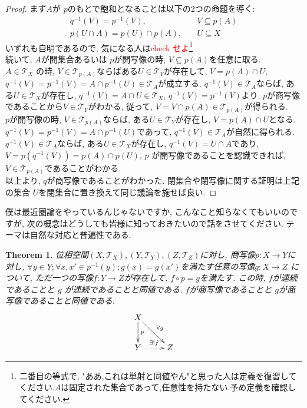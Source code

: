 \documentclass[dvipdfmx]{jbook}
\newtheorem{theorem}{Theorem}[section]
\theoremstyle{remark}
\theoremstyle{plain}
\begin{document}
\begin{proof}%
	まず$A$が $p$のもとで飽和となることは以下の2つの命題を導く:
	 \[
	\begin{aligned}%
		q^{-1}(V) = p ^{-1}(V), \quad & V \subseteq p(A)\\
		p(U\cap A) = p(U) \cap p(A), \quad & U\subseteq X 
	\end{aligned}
	\]
	いずれも自明であるので, 気になる人は\textcolor{red}{check せよ}\footnote{二番目の等式で, "ああ,これは単射と同値やん"と思った人は定義を復習してください.$A$は固定された集合であって,任意性を持たない.予め定義を確認してください.}\\
	続いて, $A$が開集合あるいは $p$が開写像の時,  $V \subseteq p(A)$を任意に取る.\\
	$A \in \mathcal{T}_X$ の時, $V \in \mathcal{T}_{p(A)}$ならばある$U \in \mathcal{T}_Y $が存在して, 
	$V = p(A) \cap U$, $q^{-1}(V) = p ^{-1}(V) = A \cap p^{-1}(U) \in \mathcal{T}_A$が成立する. 
	$q^{-1}(V) \in \mathcal{T}_A$ならば, ある$U \in \mathcal{T}_X$が存在し, 
	$q^{-1}(V) = A \cap U \in \mathcal{T}_X$, $q^{-1}(V) = p ^{-1}(V)$より, 
	$p$が商写像であることから$V \in \mathcal{T}_Y$がわかる, 従って, $V =V \cap p(A)\in \mathcal{T}_{p(A)}$が得られる. \\
	$p$が開写像の時,  $V \in \mathcal{T}_{p(A)}$ならば, ある$U \in \mathcal{T}_Y$が存在し, 
	$V = p(A) \cap U$となる. 
	$q^{-1}(V) = p ^{-1}(V) = A \cap p ^{-1}(U)$であって, 
	$q^{-1}(V) \in \mathcal{T}_A$が自然に得られる. 
	$q^{-1}(V) \in \mathcal{T}_A$ならば, ある$U \in \mathcal{T}_X$が存在し,
	$q^{-1} (V) =U \cap A$であり, $V=p(q^{-1}(V)) = p(A) \cap p(U)$, 
	$p$ が開写像であることを認識できれば, $V \in \mathcal{T}_{p(A)}$であることがわかる.\\
	以上より, $q$が商写像であることがわかった. 閉集合や閉写像に関する証明は上記の集合 $U$を閉集合に置き換えて同じ議論を施せば良い.
\end{proof}

僕は最近圏論をやっているんじゃないですか, こんなこと知らなくてもいいのですが, 次の概念はどうしても皆様に知っておきたいので話をさせてください. テーマは自然な対応と普遍性である.

\begin{theorem}%
	位相空間$\left( X, \mathcal{T}_X \right) ,\left( Y,\mathcal{T}_Y \right) , \left( Z , \mathcal{T}_Z\right) $に対し, 商写像$p: X \to Y$に対し, $\forall y \in Y; \forall x ,x'\in p ^{-1}({y});g(x)=g(x')$を満たす任意の写像$g: X \to Z$ について, ただ一つの写像$f: Y\to Z$が存在して, $f \circ p = g$を満たす. この時,  $f$が連続であることと $g$ が連続であることと同値である. $f$が商写像であることと $g$が商写像であることと同値である.
\[
	\xymatrix{
		X \ar[d]^{p} \ar[rd]^{\forall g} \\
		Y \ar@{..>}[r]^{\exists !f} &Z
	}
\] 		
\end{theorem}
\end{document}
